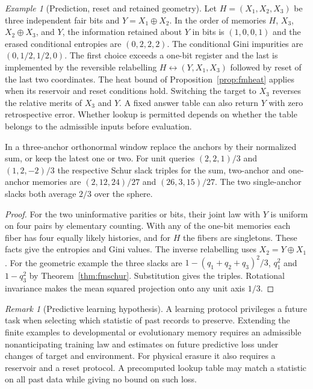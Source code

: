 \documentclass[aps,pra,onecolumn,superscriptaddress,nofootinbib,10pt]{revtex4-2}
\theoremstyle{definition}
\theoremstyle{remark}
\newtheorem{remark}[theorem]{Remark}
\newtheorem{example}[theorem]{Example}
\begin{document}
\begin{example}[Prediction, reset and retained geometry]\label{ob:memoryexample}
Let $H=(X_1,X_2,X_3)$ be three independent fair bits and
$Y=X_1\oplus X_2$. In the order of memories
$H$, $X_3$, $X_2\oplus X_3$, and $Y$, the information retained about
$Y$ in bits is $(1,0,0,1)$ and the erased conditional entropies are
$(0,2,2,2)$. The conditional Gini impurities are $(0,1/2,1/2,0)$.
The first choice exceeds a one-bit register and the last is implemented
by the reversible relabelling $H\leftrightarrow (Y,X_1,X_3)$ followed
by reset of the last two coordinates. The heat bound of
Proposition~\ref{prop:fmheat} applies when its reservoir and reset
conditions hold. Switching the target to $X_3$ reverses the
relative merits of $X_3$ and $Y$. A fixed answer table can also
return $Y$ with zero retrospective error. Whether lookup is
permitted depends on whether the table belongs to the admissible
inputs before evaluation.

In a three-anchor orthonormal window replace the anchors by their
normalized sum, or keep the latest one or two. For unit queries
$(2,2,1)/3$ and $(1,2,-2)/3$ the respective Schur slack triples
for the sum, two-anchor and one-anchor memories are
$(2,12,24)/27$ and $(26,3,15)/27$. The two single-anchor slacks
both average $2/3$ over the sphere.
\end{example}
\begin{proof}
For the two uninformative parities or bits, their joint law with
$Y$ is uniform on four pairs by elementary counting. With any
of the one-bit memories each fiber has four equally likely
histories, and for $H$ the fibers are singletons. These facts give
the entropies and Gini values. The inverse relabelling uses
$X_2=Y\oplus X_1$. For the geometric example the three slacks
are $1-(q_1+q_2+q_3)^2/3$, $q_1^2$ and $1-q_3^2$ by
Theorem~\ref{thm:fmschur}. Substitution gives the triples.
Rotational invariance makes the mean squared projection
onto any unit axis $1/3$.
\end{proof}

\begin{remark}[Predictive learning hypothesis]\label{ob:learninghypothesis}
A learning protocol privileges a future task when selecting which
statistic of past records to preserve. Extending the finite examples
to developmental or evolutionary memory requires an admissible
nonanticipating training law and estimates on future predictive loss
under changes of target and environment. For physical erasure it also
requires a reservoir and a reset protocol. A precomputed lookup table may
match a statistic on all past data while giving no bound on such loss.
\end{remark}
\end{document}
